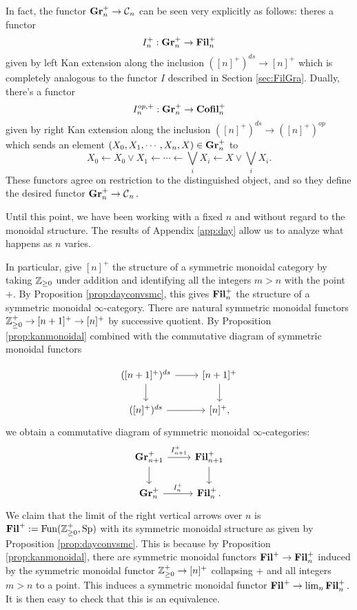In fact, the functor $\operatorname{\textbf{Gr}}_n^+ \to \operatorname{\mathcal{C}}_n$ can be seen very explicitly as follows: theres a functor $$I_n^+: \operatorname{\textbf{Gr}}_n^+ \to \operatorname{\textbf{Fil}}_n^+$$ given by left Kan extension along the inclusion $([n]^+)^{ds} \to [n]^+$ which is completely analogous to the functor $I$ described in Section \ref{sec:FilGra}.  Dually, there's a functor $$I_n^{op,+}:\operatorname{\textbf{Gr}}_n^+ \to \operatorname{\textbf{Cofil}}_n^+$$ given by right Kan extension along the inclusion $([n]^+)^{ds} \to ([n]^+)^{op}$ which sends an element $(X_0, X_1, \cdots, X_n, X)\in \operatorname{\textbf{Gr}}_n^+$ to $$X_0 \longleftarrow X_0\vee X_1 \longleftarrow \cdots \longleftarrow \bigvee_i X_i \longleftarrow X \vee \bigvee_i X_i.$$  These functors agree on restriction to the distinguished object, and so they define the desired functor $\operatorname{\textbf{Gr}}_n^+ \to \operatorname{\mathcal{C}}_n.$  



Until this point, we have been working with a fixed $n$ and without regard to the monoidal structure.  The results of Appendix \ref{app:day} allow us to analyze what happens as $n$ varies.   

In particular, give $[n]^+$ the structure of a symmetric monoidal category by taking $\operatorname{\mathbb{Z}}_{\geq 0}$ under addition and identifying all the integers $m >n$ with the point $+$.  By Proposition \ref{prop:dayconvsmc}, this gives $\operatorname{\textbf{Fil}}_n^+$ the structure of a symmetric monoidal $\infty$-category.  There are natural symmetric monoidal functors $\operatorname{\mathbb{Z}}_{\geq 0}^+ \to [n+1]^+ \to [n]^+$ by successive quotient.  By Proposition \ref{prop:kanmonoidal} combined with the commutative diagram of symmetric monoidal functors

$$
\begin{tikzcd}
(\lbrack n+1\rbrack^+)^{ds} \arrow[r] \arrow[d] & \lbrack n+1\rbrack^+ \arrow[d]\\
(\lbrack n\rbrack^+)^{ds} \arrow[r] & \lbrack n\rbrack^+ ,
\end{tikzcd}
$$
we obtain a commutative diagram of symmetric monoidal $\infty$-categories:
$$
\begin{tikzcd}
\Gr_{n+1}^+ \arrow[r,"I_{n+1}^+"] \arrow[d] & \Fil_{n+1}^+ \arrow[d]\\
\Gr_n^+  \arrow[r,"I_n^+"] & \Fil_n^+ .
\end{tikzcd}
$$
We claim that the limit of the right vertical arrows over $n$ is $\operatorname{\textbf{Fil}}^+ := \operatorname{\text{Fun}}(\operatorname{\mathbb{Z}}_{\geq 0}^+,\operatorname{\text{Sp}})$ with its symmetric monoidal structure as given by Proposition \ref{prop:dayconvsmc}.  This is because by Proposition \ref{prop:kanmonoidal}, there are symmetric monoidal functors $\operatorname{\textbf{Fil}}^+ \to \operatorname{\textbf{Fil}}_n^+$ induced by the symmetric monoidal functor $\operatorname{\mathbb{Z}}_{\geq 0}^+ \to [n]^+$ collapsing $+$ and all integers $m> n$ to a point.  This induces a symmetric monoidal functor $\operatorname{\textbf{Fil}}^+ \to \lim_n \operatorname{\textbf{Fil}}_n^{+}.$  It is then easy to check that this is an equivalence.  

